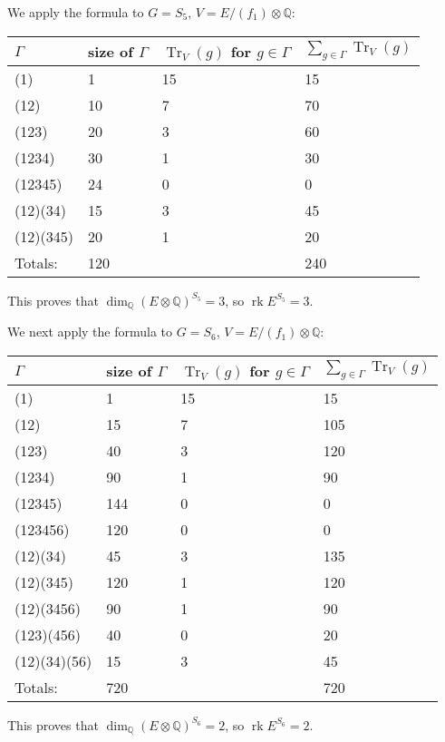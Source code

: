 \documentclass[a4paper,12pt]{amsart}
\begin{document}
We apply the formula to $G=S_5$, $V= E/(f_1) \otimes {\mathbb{Q}}$:
\begin{center}
\begin{tabular}{l|l|l|l}
$\Gamma$ 	& size of $\Gamma$ & $\operatorname{Tr}_V(g)$  for $g \in \Gamma$ & $\sum_{g \in \Gamma} \operatorname{Tr}_V(g)$ \\
\hline
\hline
(1)		& 1	& 15		& 15 \\	
\hline
(12)		& 10	& 7		& 70 \\
\hline
(123)		& 20	& 3		& 60 \\
\hline
(1234)		& 30	& 1		& 30 \\
\hline
(12345)		& 24	& 0		& 0 \\
\hline
(12)(34)	& 15	& 3		& 45 \\
\hline
(12)(345)	& 20	& 1		& 20 \\
\hline
\hline
Totals:		& 120	&		& 240
\end{tabular}
\end{center}
This proves that $\dim_{\mathbb{Q}} (E \otimes {\mathbb{Q}})^{S_5} = 3$, so ${\operatorname{rk}} E^{S_5} = 3$.

We next apply the formula to $G=S_6$, $V= E/(f_1) \otimes {\mathbb{Q}}$:
\begin{center}
\begin{tabular}{l|l|l|l}
$\Gamma$ 	& size of $\Gamma$	& $\operatorname{Tr}_V(g)$ for $g \in \Gamma$ & $\sum_{g \in \Gamma} \operatorname{Tr}_V(g)$ \\
\hline
\hline
(1)		& 1	& 15		& 15 \\	
\hline
(12)		& 15	& 7		& 105 \\
\hline
(123)		& 40	& 3		& 120 \\
\hline
(1234)		& 90	& 1		& 90 \\
\hline
(12345)		& 144	& 0		& 0 \\
\hline
(123456)	& 120	& 0		& 0 \\
\hline
(12)(34)	& 45	& 3		& 135 \\
\hline
(12)(345)	& 120	& 1		& 120 \\
\hline
(12)(3456)	& 90	& 1		& 90 \\
\hline
(123)(456)	& 40	& 0		& 20 \\
\hline
(12)(34)(56)	& 15	& 3		& 45 \\
\hline
\hline
Totals:		& 720	&		& 720
\end{tabular}
\end{center}
This proves that $\dim_{\mathbb{Q}} (E \otimes {\mathbb{Q}})^{S_6} = 2$, so ${\operatorname{rk}} E^{S_6} = 2$.
\end{document}
